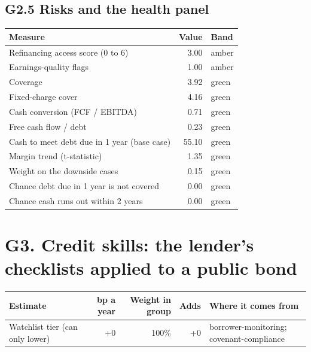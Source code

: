\documentclass[11pt,a4paper]{article}
\begin{document}
\subsection*{G2.5 Risks and the health panel}
\begin{center}\footnotesize\setlength{\tabcolsep}{3.5pt}\begin{tabular}{@{}lrl@{}}\toprule
Measure & Value & Band \\\midrule
Refinancing access score (0 to 6) & 3.00 & \textcolor{amber}{amber} \\
Earnings-quality flags & 1.00 & \textcolor{amber}{amber} \\
Coverage & 3.92 & \textcolor{good}{green} \\
Fixed-charge cover & 4.16 & \textcolor{good}{green} \\
Cash conversion (FCF / EBITDA) & 0.71 & \textcolor{good}{green} \\
Free cash flow / debt & 0.23 & \textcolor{good}{green} \\
Cash to meet debt due in 1 year (base case) & 55.10 & \textcolor{good}{green} \\
Margin trend (t-statistic) & 1.35 & \textcolor{good}{green} \\
Weight on the downside cases & 0.15 & \textcolor{good}{green} \\
Chance debt due in 1 year is not covered & 0.00 & \textcolor{good}{green} \\
Chance cash runs out within 2 years & 0.00 & \textcolor{good}{green} \\
\bottomrule\end{tabular}\end{center}
\section*{G3. Credit skills: the lender's checklists applied to a public bond}
\par\noindent{}
\begin{center}\footnotesize\setlength{\tabcolsep}{3.5pt}\begin{tabular}{@{}p{6.2cm}rrrp{4.2cm}@{}}\toprule
Estimate & bp a year & Weight in group & Adds & Where it comes from \\\midrule
Watchlist tier (can only lower) & +0 & 100\% & +0 & borrower-monitoring; covenant-compliance \\
\bottomrule\end{tabular}\end{center}
\end{document}
